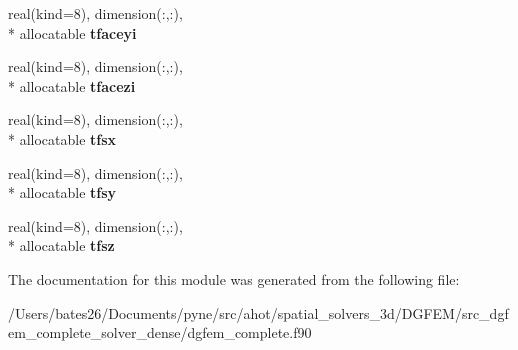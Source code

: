\begin{DoxyCompactItemize}
\item 
\hypertarget{classdgfem__complete_af85bf1e05f71c76d98d526af5136dee1}{real(kind=8), dimension(\+:,\+:), \\*
allocatable {\bfseries tfaceyi}}\label{classdgfem__complete_af85bf1e05f71c76d98d526af5136dee1}

\item 
\hypertarget{classdgfem__complete_a0285def64a53bc7571d814fc42c792fa}{real(kind=8), dimension(\+:,\+:), \\*
allocatable {\bfseries tfacezi}}\label{classdgfem__complete_a0285def64a53bc7571d814fc42c792fa}

\item 
\hypertarget{classdgfem__complete_a55847a58d7ae96c99ccf66d1011e6e81}{real(kind=8), dimension(\+:,\+:), \\*
allocatable {\bfseries tfsx}}\label{classdgfem__complete_a55847a58d7ae96c99ccf66d1011e6e81}

\item 
\hypertarget{classdgfem__complete_aac557b89d76ddb045babcaad8fa46e3f}{real(kind=8), dimension(\+:,\+:), \\*
allocatable {\bfseries tfsy}}\label{classdgfem__complete_aac557b89d76ddb045babcaad8fa46e3f}

\item 
\hypertarget{classdgfem__complete_a49f986fbeac48027410bd2e2a2736057}{real(kind=8), dimension(\+:,\+:), \\*
allocatable {\bfseries tfsz}}\label{classdgfem__complete_a49f986fbeac48027410bd2e2a2736057}

\end{DoxyCompactItemize}


The documentation for this module was generated from the following file\+:\begin{DoxyCompactItemize}
\item 
/\+Users/bates26/\+Documents/pyne/src/ahot/spatial\+\_\+solvers\+\_\+3d/\+D\+G\+F\+E\+M/src\+\_\+dgfem\+\_\+complete\+\_\+solver\+\_\+dense/dgfem\+\_\+complete.\+f90\end{DoxyCompactItemize}
